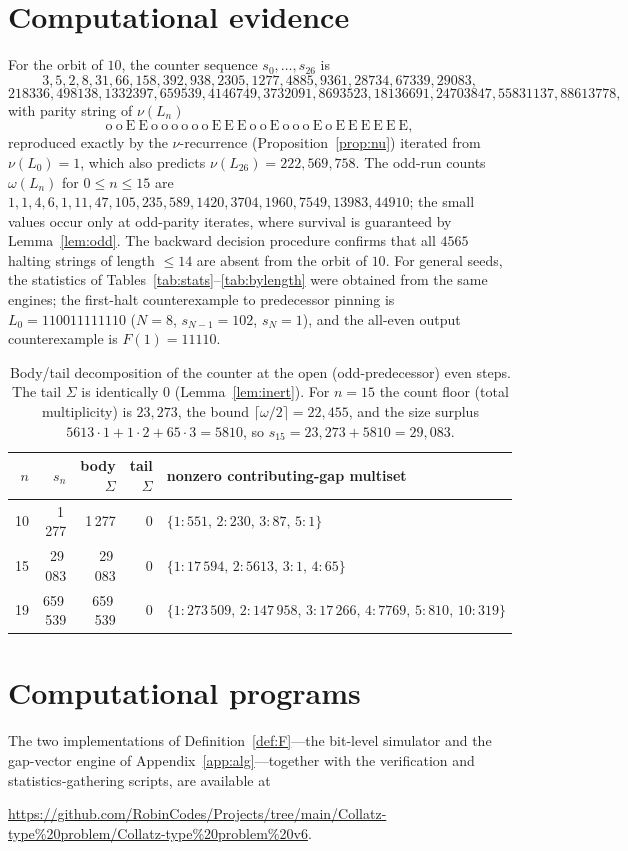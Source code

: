 \documentclass[11pt,reqno]{amsart}
\theoremstyle{plain}
\theoremstyle{definition}
\theoremstyle{remark}
\begin{document}
\section{Computational evidence}\label{app:evidence}
For the orbit of $10$, the counter sequence $s_0,\dots,s_{26}$ is
\[ 3,5,2,8,31,66,158,392,938,2305,1277,4885,9361,28734,67339,29083,\]\[218336,498138,1332397,659539,4146749,3732091,8693523,18136691,24703847,55831137,88613778, \]
with parity string of $\nu(L_n)$
\[ \mathrm{o\ o\ E\ E\ o\ o\ o\ o\ o\ o\ E\ E\ E\ o\ o\ E\ o\ o\ o\ E\ o\ E\ E\ E\ E\ E\ E}, \]
reproduced exactly by the $\nu$-recurrence (Proposition~\ref{prop:nu}) iterated from $\nu(L_0)=1$, which also predicts $\nu(L_{26})=222{,}569{,}758$. The odd-run counts $\omega(L_n)$ for $0\le n\le 15$ are $1,1,4,6,1,11,47,105,235,589,1420,3704,1960,7549,13983,44910$; the small values occur only at odd-parity iterates, where survival is guaranteed by Lemma~\ref{lem:odd}. The backward decision procedure confirms that all $4565$ halting strings of length $\le 14$ are absent from the orbit of $10$. For general seeds, the statistics of Tables~\ref{tab:stats}--\ref{tab:bylength} were obtained from the same engines; the first-halt counterexample to predecessor pinning is $L_0=110011111110$ ($N=8$, $s_{N-1}=102$, $s_N=1$), and the all-even output counterexample is $F(1)=11110$.

\begin{table}[h]\centering
\begin{tabular}{rrrr|l}
$n$ & $s_n$ & body $\Sigma$ & tail $\Sigma$ & nonzero contributing-gap multiset\\
\hline
10 & 1\,277 & 1\,277 & 0 & $\{1:551,\,2:230,\,3:87,\,5:1\}$\\
15 & 29\,083 & 29\,083 & 0 & $\{1:17\,594,\,2:5613,\,3:1,\,4:65\}$\\
19 & 659\,539 & 659\,539 & 0 & $\{1:273\,509,\,2:147\,958,\,3:17\,266,\,4:7769,\,5:810,\,10:319\}$
\end{tabular}
\caption{Body/tail decomposition of the counter at the open (odd-predecessor) even steps. The tail $\Sigma$ is identically $0$ (Lemma~\ref{lem:inert}). For $n=15$ the count floor (total multiplicity) is $23{,}273$, the bound $\lceil\omega/2\rceil=22{,}455$, and the size surplus $5613\cdot 1+1\cdot 2+65\cdot 3=5810$, so $s_{15}=23{,}273+5810=29{,}083$.}
\label{tab:decomp}
\end{table}

\section{Computational programs}\label{app:programs}
The two implementations of Definition~\ref{def:F}---the bit-level simulator and the gap-vector engine of Appendix~\ref{app:alg}---together with the verification and statistics-gathering scripts, are available at
\begin{center}
\url{https://github.com/RobinCodes/Projects/tree/main/Collatz-type%20problem/Collatz-type%20problem%20v6}.
\end{center}
\end{document}
